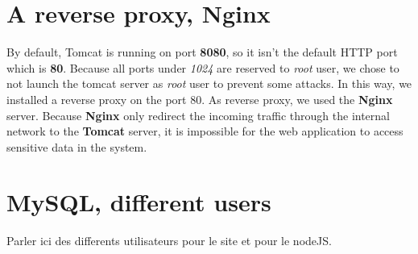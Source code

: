 \section{A reverse proxy, Nginx}

By default, Tomcat is running on port \textbf{8080}, so it isn't the default HTTP port which is \textbf{80}. Because all ports under \textit{1024} are reserved to \textit{root} user, we chose to not launch the tomcat server as \textit{root} user to prevent some attacks. In this way, we installed a reverse proxy on the port 80. As reverse proxy, we used the \textbf{Nginx} server.
Because \textbf{Nginx} only redirect the incoming traffic through the internal network to the \textbf{Tomcat} server, it is impossible for the web application to access sensitive data in the system.

\section{MySQL, different users}
Parler ici des differents utilisateurs pour le site et pour le nodeJS.

